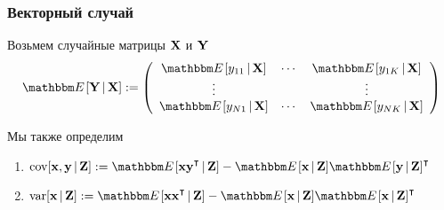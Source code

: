 \begin{frame}\frametitle{Векторный случай}

    \vspace{2em}
    Возьмем случайные матрицы $\mathbf X$ и $\mathbf Y$
    \begin{equation*}
        \EE [\boldY \given \boldX]
        := 
        \left(
        \begin{array}{cccc}
            \EE [y_{11} \given \boldX]  & \cdots & \EE [y_{1K} \given \boldX] \\
            \vdots &  & \vdots \\
            \EE [y_{N1} \given \boldX]  & \cdots & \EE [y_{NK} \given \boldX]
        \end{array}
        \right)
    \end{equation*}
    
    \vspace{1em}
    Мы также определим
    \begin{enumerate}
        \item $\cov [\boldx, \boldy \given \boldZ]
         := \EE[ \boldx \boldy^\T \given \boldZ ] - \EE[\boldx\given \boldZ ]
         \EE[\boldy\given \boldZ ]^\T$
        \item $\var[\boldx \given \boldZ] 
        := \EE [\boldx \boldx^\T\given \boldZ ] - 
            \EE [\boldx\given \boldZ ] \EE[\boldx\given \boldZ ]^\T$
    \end{enumerate}

\end{frame}

